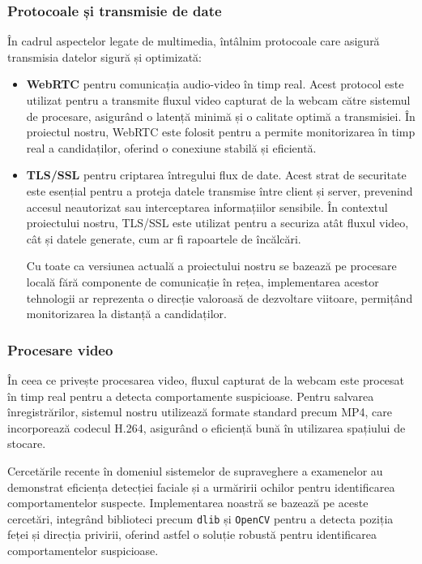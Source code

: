 \documentclass[12pt,a4paper]{article}
\begin{document}
\subsubsection{Protocoale și transmisie de date}
În cadrul aspectelor legate de multimedia, întâlnim protocoale care
asigură transmisia datelor sigură și optimizată:
\begin{itemize}
    \item \textbf{WebRTC} pentru comunicația audio-video în timp real. Acest protocol este utilizat pentru a transmite fluxul video capturat de la webcam către sistemul de procesare, asigurând o latență minimă și o calitate optimă a transmisiei\cite{sredojev2015webrtc}. În proiectul nostru, WebRTC este folosit pentru a permite monitorizarea în timp real a candidaților, oferind o conexiune stabilă și eficientă.
    \item \textbf{TLS/SSL} pentru criptarea întregului flux de date. Acest strat de securitate este esențial pentru a proteja datele transmise între client și server, prevenind accesul neautorizat sau interceptarea informațiilor sensibile\cite{yang2018tls}. În contextul proiectului nostru, TLS/SSL este utilizat pentru a securiza atât fluxul video, cât și datele generate, cum ar fi rapoartele de încălcări.

    Cu toate ca versiunea actuală a proiectului nostru se bazează pe procesare locală fără componente de comunicație în rețea, implementarea acestor tehnologii ar reprezenta o direcție valoroasă de dezvoltare viitoare, permițând monitorizarea la distanță a candidaților.
\end{itemize}

\subsubsection{Procesare video}
În ceea ce privește procesarea video, fluxul capturat de la webcam este procesat în timp real pentru a detecta comportamente suspicioase. Pentru salvarea înregistrărilor, sistemul nostru utilizează formate standard precum MP4, care incorporează codecul H.264, asigurând o eficiență bună în utilizarea spațiului de stocare\cite{goodfellow2016deep}.

Cercetările recente în domeniul sistemelor de supraveghere a examenelor au demonstrat eficiența detecției faciale și a urmăririi ochilor pentru identificarea comportamentelor suspecte\cite{alem2021novel}. Implementarea noastră se bazează pe aceste cercetări, integrând biblioteci precum \texttt{dlib} și \texttt{OpenCV} pentru a detecta poziția feței și direcția privirii, oferind astfel o soluție robustă pentru identificarea comportamentelor suspicioase.
\end{document}
